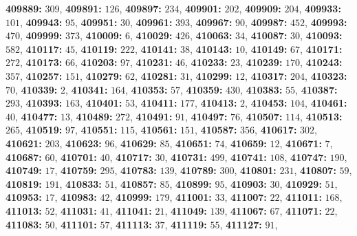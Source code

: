 \textsf{\bfseries 409889:} $309$, \textsf{\bfseries 409891:} $126$, \textsf{\bfseries 409897:} $234$, \textsf{\bfseries 409901:} $202$, \textsf{\bfseries 409909:} $204$, \textsf{\bfseries 409933:} $101$, \textsf{\bfseries 409943:} $95$, \textsf{\bfseries 409951:} $30$, \textsf{\bfseries 409961:} $393$, \textsf{\bfseries 409967:} $90$, \textsf{\bfseries 409987:} $452$, \textsf{\bfseries 409993:} $470$, \textsf{\bfseries 409999:} $373$, \textsf{\bfseries 410009:} $6$, \textsf{\bfseries 410029:} $426$, \textsf{\bfseries 410063:} $34$, \textsf{\bfseries 410087:} $30$, \textsf{\bfseries 410093:} $582$, \textsf{\bfseries 410117:} $45$, \textsf{\bfseries 410119:} $222$, \textsf{\bfseries 410141:} $38$, \textsf{\bfseries 410143:} $10$, \textsf{\bfseries 410149:} $67$, \textsf{\bfseries 410171:} $272$, \textsf{\bfseries 410173:} $66$, \textsf{\bfseries 410203:} $97$, \textsf{\bfseries 410231:} $46$, \textsf{\bfseries 410233:} $23$, \textsf{\bfseries 410239:} $170$, \textsf{\bfseries 410243:} $357$, \textsf{\bfseries 410257:} $151$, \textsf{\bfseries 410279:} $62$, \textsf{\bfseries 410281:} $31$, \textsf{\bfseries 410299:} $12$, \textsf{\bfseries 410317:} $204$, \textsf{\bfseries 410323:} $70$, \textsf{\bfseries 410339:} $2$, \textsf{\bfseries 410341:} $164$, \textsf{\bfseries 410353:} $57$, \textsf{\bfseries 410359:} $430$, \textsf{\bfseries 410383:} $55$, \textsf{\bfseries 410387:} $293$, \textsf{\bfseries 410393:} $163$, \textsf{\bfseries 410401:} $53$, \textsf{\bfseries 410411:} $177$, \textsf{\bfseries 410413:} $2$, \textsf{\bfseries 410453:} $104$, \textsf{\bfseries 410461:} $40$, \textsf{\bfseries 410477:} $13$, \textsf{\bfseries 410489:} $272$, \textsf{\bfseries 410491:} $91$, \textsf{\bfseries 410497:} $76$, \textsf{\bfseries 410507:} $114$, \textsf{\bfseries 410513:} $265$, \textsf{\bfseries 410519:} $97$, \textsf{\bfseries 410551:} $115$, \textsf{\bfseries 410561:} $151$, \textsf{\bfseries 410587:} $356$, \textsf{\bfseries 410617:} $302$, \textsf{\bfseries 410621:} $203$, \textsf{\bfseries 410623:} $96$, \textsf{\bfseries 410629:} $85$, \textsf{\bfseries 410651:} $74$, \textsf{\bfseries 410659:} $12$, \textsf{\bfseries 410671:} $7$, \textsf{\bfseries 410687:} $60$, \textsf{\bfseries 410701:} $40$, \textsf{\bfseries 410717:} $30$, \textsf{\bfseries 410731:} $499$, \textsf{\bfseries 410741:} $108$, \textsf{\bfseries 410747:} $190$, \textsf{\bfseries 410749:} $17$, \textsf{\bfseries 410759:} $295$, \textsf{\bfseries 410783:} $139$, \textsf{\bfseries 410789:} $300$, \textsf{\bfseries 410801:} $231$, \textsf{\bfseries 410807:} $59$, \textsf{\bfseries 410819:} $191$, \textsf{\bfseries 410833:} $51$, \textsf{\bfseries 410857:} $85$, \textsf{\bfseries 410899:} $95$, \textsf{\bfseries 410903:} $30$, \textsf{\bfseries 410929:} $51$, \textsf{\bfseries 410953:} $17$, \textsf{\bfseries 410983:} $42$, \textsf{\bfseries 410999:} $179$, \textsf{\bfseries 411001:} $33$, \textsf{\bfseries 411007:} $22$, \textsf{\bfseries 411011:} $168$, \textsf{\bfseries 411013:} $52$, \textsf{\bfseries 411031:} $41$, \textsf{\bfseries 411041:} $21$, \textsf{\bfseries 411049:} $139$, \textsf{\bfseries 411067:} $67$, \textsf{\bfseries 411071:} $22$, \textsf{\bfseries 411083:} $50$, \textsf{\bfseries 411101:} $57$, \textsf{\bfseries 411113:} $37$, \textsf{\bfseries 411119:} $55$, \textsf{\bfseries 411127:} $91$, 
